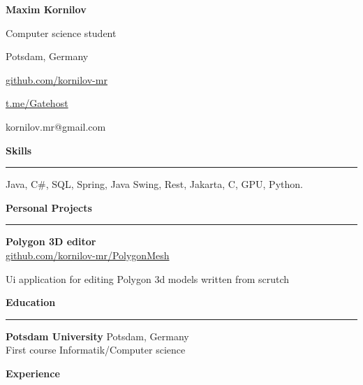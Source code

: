 \documentclass[9pt]{article}
\begin{document}
\begin{multicols}{2}

\noindent
\vspace{3em}
\noindent

{\huge{\textbf{Maxim Kornilov}}}

Computer science student

Potsdam, Germany
\vspace{1.0em}

\href{https://github.com/kornilov-mr}{github.com/kornilov-mr}

\href{https://t.me/Gatehost}{t.me/Gatehost}

kornilov.mr@gmail.com

\vspace{5em}

{\textbf{Skills}}
\vspace{0.5em}
\hrule
\vspace{1.0em}

Java, C\#, SQL, Spring, Java Swing, Rest, Jakarta, C, GPU, Python.

\vspace{1em}
{\textbf{Personal Projects}}
\vspace{0.5em}
\hrule
\vspace{1em}

{\textbf{Polygon 3D editor}}\\[1\baselineskip]
\href{https://github.com/kornilov-mr/PolygonMesh}{github.com/kornilov-mr/PolygonMesh}

Ui application for editing Polygon 3d models written from scrutch

\vspace{2em}
{\textbf{Education}}
\vspace{0.5em}
\hrule
\vspace{1em}

{\textbf{Potsdam University}} \color{gray} Potsdam, Germany \color{black}
\\[1\baselineskip]
\color{black} First course \color{black}
\vspace{0.3em}
\color{black} Informatik/Computer science \color{black}

\columnbreak

\vspace{0.5em}

{\textbf{Experience}}

\vspace{10.5em}




\end{multicols}
\end{document}
